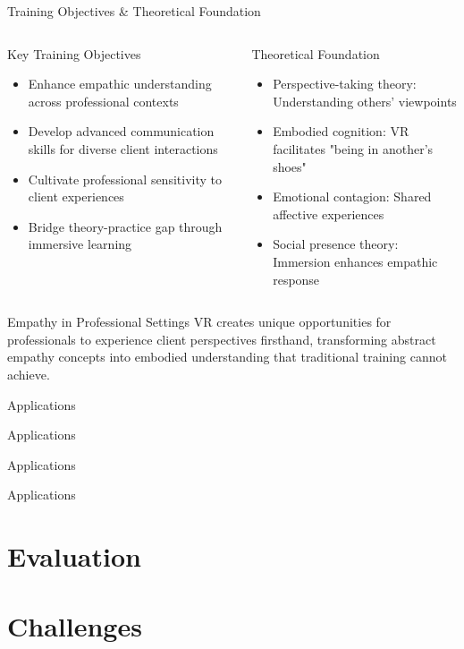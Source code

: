 \documentclass[aspectratio=169,xcolor=dvipsnames]{beamer}
\begin{document}
\begin{frame}{Training Objectives \& Theoretical Foundation}
    
    \begin{columns}[c]
        \begin{block}{Key Training Objectives}
            \begin{itemize}
                \item Enhance empathic understanding across professional contexts
                \item Develop advanced communication skills for diverse client interactions
                \item Cultivate professional sensitivity to client experiences
                \item Bridge theory-practice gap through immersive learning
            \end{itemize}
        \end{block}
        
        \begin{block}{Theoretical Foundation}
            \begin{itemize}
                \item Perspective-taking theory: Understanding others' viewpoints
                \item Embodied cognition: VR facilitates "being in another's shoes"
                \item Emotional contagion: Shared affective experiences
                \item Social presence theory: Immersion enhances empathic response
            \end{itemize}
        \end{block}
    \end{columns}
    
    \begin{alertblock}{Empathy in Professional Settings}
        VR creates unique opportunities for professionals to experience client perspectives firsthand, transforming abstract empathy concepts into embodied understanding that traditional training cannot achieve.
    \end{alertblock}
\end{frame}


\begin{frame}{Applications}
\end{frame}

\begin{frame}{Applications}
\end{frame}

\begin{frame}{Applications}
\end{frame}

\begin{frame}{Applications}
\end{frame}
\section{Evaluation}

\section{Challenges}
\end{document}
